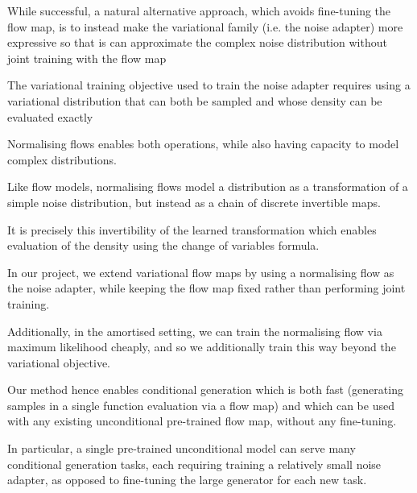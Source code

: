 \documentclass[12pt,a4paper]{report}
\begin{document}
While successful, a natural alternative approach, which avoids fine-tuning the flow map, is to instead make the variational family (i.e. the noise adapter) more expressive so that is can approximate the complex noise distribution without joint training with the flow map

The variational training objective used to train the noise adapter requires using a variational distribution that can both be sampled and whose density can be evaluated exactly

Normalising flows enables both operations, while also having capacity to model complex distributions. 

Like flow models, normalising flows model a distribution as a transformation of a simple noise distribution, but instead as a chain of discrete invertible maps. 

It is precisely this invertibility of the learned transformation which enables evaluation of the density using the change of variables formula. 

In our project, we extend variational flow maps by using a normalising flow as the noise adapter, while keeping the flow map fixed rather than performing joint training.  

Additionally, in the amortised setting, we can train the normalising flow via maximum likelihood cheaply, and so we additionally train this way beyond the variational objective. 

Our method hence enables conditional generation which is both fast (generating samples in a single function evaluation via a flow map) and which can be used with any existing unconditional pre-trained flow map, without any fine-tuning. 

In particular, a single pre-trained unconditional model can serve many conditional generation tasks, each requiring training a relatively small noise adapter, as opposed to fine-tuning the large generator for each new task.




\end{document}
